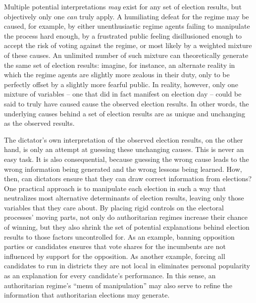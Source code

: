 \documentclass[12pt]{article}\usepackage[]{graphicx}\usepackage[]{color}
\newcommand{\1}{\mathbbm{1}}
\begin{document}
Multiple potential interpretations \textit{may} exist for any set of election results, but objectively only one \textit{can} truly apply. A humiliating defeat for the regime may be caused, for example, by either unenthusiastic regime agents failing to manipulate the process hard enough, by a frustrated public feeling disillusioned enough to accept the risk of voting against the regime, or most likely by a weighted mixture of these causes. An unlimited number of such mixture can theoretically generate the same set of election results: imagine, for instance, an alternate reality in which the regime agents are slightly more zealous in their duty, only to be perfectly offset by a slightly more fearful public. In reality, however, only one mixture of variables -- one that did in fact manifest on election day -- could be said to truly have caused cause the observed election results. In other words, the underlying causes behind a set of election results are as unique and unchanging as the observed results. 

The dictator's own interpretation of the observed election results, on the other hand, is only an attempt at guessing these unchanging causes. This is never an easy task. It is also consequential, because guessing the wrong cause leads to the wrong information being generated and the wrong lessons being learned. How, then, can dictators ensure that they can draw correct information from elections? One practical approach is to manipulate each election in such a way that neutralizes most alternative determinants of election results, leaving only those variables that they care about. By placing rigid controls on the electoral processes' moving parts, not only do authoritarian regimes increase their chance of winning, but they also shrink the set of potential explanations behind election results to those factors uncontrolled for. As an example, banning opposition parties or candidates ensures that vote shares for the incumbents are not influenced by support for the opposition. As another example, forcing all candidates to run in districts they are not local in eliminates personal popularity as an explanation for every candidate's performance. In this sense, an authoritarian regime's ``menu of manipulation'' \citep{Schedler2002menu} may also serve to refine the information that authoritarian elections may generate.
\end{document}
